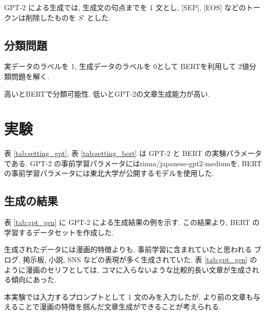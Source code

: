 \documentclass[twocolumn]{jarticle}     %
\begin{document}
GPT-2 による生成では, 生成文の句点までを 1 文とし, [SEP], [EOS] などのトークンは削除したものを $S’$ とした.


\subsection{分類問題}
実データのラベルを 1, 生成データのラベルを 0として BERTを利用して 2値分類問題を解く.

高いとBERTで分類可能性.
低いとGPT-2の文章生成能力が高い.

%
%

\section{実験}

表 \ref{tab:setting_gpt}, 表 \ref{tab:setting_bert} は GPT-2 と BERT の実験パラメータである.
GPT-2 の事前学習パラメータにはrinna/japanese-gpt2-mediumを, BERTの事前学習パラメータには東北大学が公開するモデルを使用した.


\subsection{生成の結果}

表 \ref{tab:gpt_gen} に GPT-2 による生成結果の例を示す.
この結果より, BERT の学習するデータセットを作成した.

生成されたデータには漫画的特徴よりも, 事前学習に含まれていたと思われる ブログ, 掲示板, 小説, SNS などの表現が多く生成されていた.
表 \ref{tab:gpt_gen} のように漫画のセリフとしては, コマに入らないような比較的長い文章が生成される傾向にあった.

本実験では入力するプロンプトとして 1 文のみを入力したが, より前の文章も与えることで漫画の特徴を掴んだ文章生成ができることが考えられる.



\end{document}
